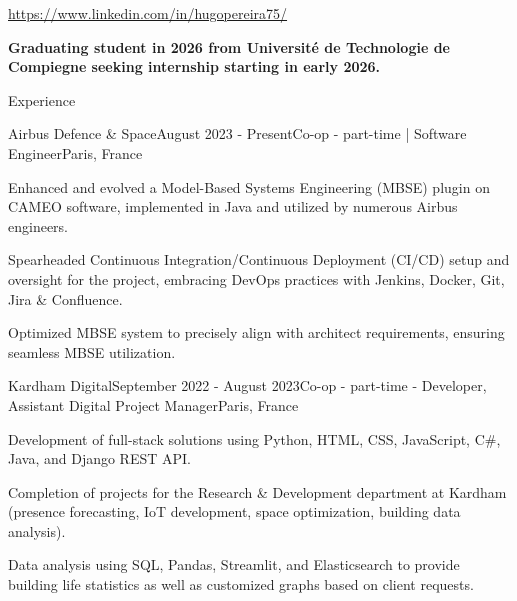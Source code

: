 \documentclass[
	10pt,
]{style} %
\begin{document}
\begin{center}
	\url{https://www.linkedin.com/in/hugopereira75/}
\end{center}

\begin{center}
	\textbf{Graduating student in 2026 from Université de Technologie de Compiegne seeking internship starting in early 2026.}
\end{center}


\begin{rSection}{Experience}

	\begin{rSubsection}{Airbus Defence \& Space}{August 2023 - Present}{Co-op - part-time | Software Engineer}{Paris, France}
		\item Enhanced and evolved a Model-Based Systems Engineering (MBSE) plugin on CAMEO software, implemented in Java and utilized by numerous Airbus engineers.
		\item Spearheaded Continuous Integration/Continuous Deployment (CI/CD) setup and oversight for the project, embracing DevOps practices with Jenkins, Docker, Git, Jira \& Confluence.
		\item Optimized MBSE system to precisely align with architect requirements, ensuring seamless MBSE utilization.
	\end{rSubsection}


	\begin{rSubsection}{Kardham Digital}{September 2022 - August 2023}{Co-op - part-time - Developer, Assistant Digital Project Manager}{Paris, France}
		\item Development of full-stack solutions using Python, HTML, CSS, JavaScript, C\#, Java, and Django REST API.
		\item Completion of projects for the Research \& Development department at Kardham (presence forecasting, IoT development, space optimization, building data analysis).
		\item Data analysis using SQL, Pandas, Streamlit, and Elasticsearch to provide building life statistics as well as customized graphs based on client requests.
	\end{rSubsection}


\end{rSection}
\end{document}
